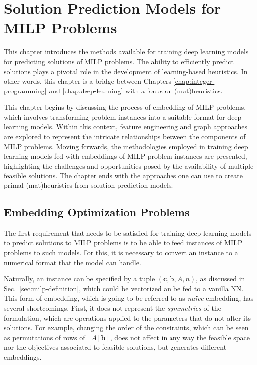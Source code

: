 

\chapter{Solution Prediction Models for MILP Problems}\label{chap:solution-prediction}


This chapter introduces the methods available for training deep learning models for predicting solutions of MILP problems.
The ability to efficiently predict solutions plays a pivotal role in the development of learning-based heuristics.
In other words, this chapter is a bridge between Chapters \ref{chap:integer-programming} and \ref{chap:deep-learning} with a focus on (mat)heuristics.

This chapter begins by discussing the process of embedding of MILP problems, which involves transforming problem instances into a suitable format for deep learning models.
Within this context, feature engineering and graph approaches are explored to represent the intricate relationships between the components of MILP problems.
Moving forwards, the methodologies employed in training deep learning models fed with embeddings of MILP problem instances are presented, highlighting the challenges and opportunities posed by the availability of multiple feasible solutions.
The chapter ends with the approaches one can use to create primal (mat)heuristics from solution prediction models.


\section{Embedding Optimization Problems}


The first requirement that needs to be satisfied for training deep learning models to predict solutions to MILP problems is to be able to feed instances of MILP problems to such models.
For this, it is necessary to convert an instance to a numerical format that the model can handle.

Naturally, an instance can be specified by a tuple $\left( \bm{c}, \bm{b}, A, n \right)$, as discussed in Sec.~\ref{sec:milp-definition}, which could be vectorized an be fed to a vanilla NN.
This form of embedding, which is going to be referred to as \emph{naïve} embedding, has several shortcomings.
First, it does not represent the \emph{symmetries} of the formulation, which are operations applied to the parameters that do not alter its solutions.
For example, changing the order of the constraints, which can be seen as permutations of rows of $\left[ A\, | \,\bm{b} \right] $, does not affect in any way the feasible space nor the objectives associated to feasible solutions, but generates different embeddings.

